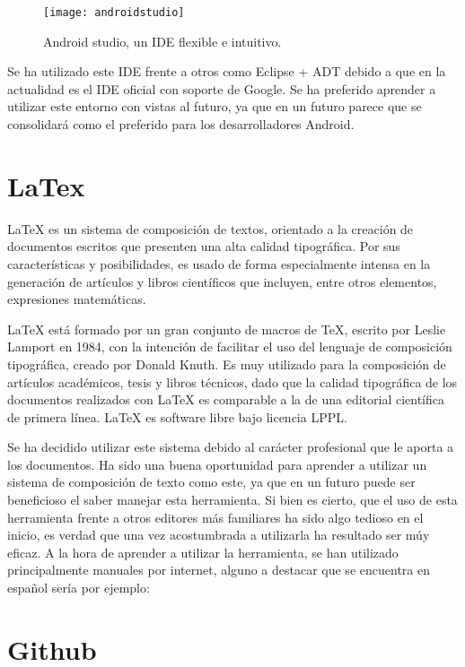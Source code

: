 \begin{figure}[h]
	\centering
	\texttt{[image: androidstudio]}
	\caption{Android studio, un IDE flexible e intuitivo.}
	\label{fig:androidstudio}
\end{figure}

Se ha utilizado este IDE frente a otros como Eclipse + ADT \cite{URL::eclipseADT} debido a que en la actualidad es el IDE oficial con soporte de Google. Se ha preferido aprender a utilizar este entorno con vistas al futuro, ya que en un futuro parece que se consolidará como el preferido para los desarrolladores Android.

\section{LaTex}

LaTeX \cite{URL::LaTeX} es un sistema de composición de textos, orientado a la creación de documentos escritos que presenten una alta calidad tipográfica. Por sus características y posibilidades, es usado de forma especialmente intensa en la generación de artículos y libros científicos que incluyen, entre otros elementos, expresiones matemáticas.


LaTeX está formado por un gran conjunto de macros de TeX, escrito por Leslie Lamport en 1984, con la intención de facilitar el uso del lenguaje de composición tipográfica, creado por Donald Knuth. Es muy utilizado para la composición de artículos académicos, tesis y libros técnicos, dado que la calidad tipográfica de los documentos realizados con LaTeX es comparable a la de una editorial científica de primera línea. LaTeX es software libre bajo licencia LPPL.


Se ha decidido utilizar este sistema debido al carácter profesional que le aporta a los documentos. Ha sido una buena oportunidad para aprender a utilizar un sistema de composición de texto como este, ya que en un futuro puede ser beneficioso el saber manejar esta herramienta. Si bien es cierto, que el uso de esta herramienta frente a otros editores más familiares ha sido algo tedioso en el inicio, es verdad que una vez acostumbrada a utilizarla ha resultado ser múy eficaz. A la hora de aprender a utilizar la herramienta, se han utilizado principalmente manuales por internet, alguno a destacar que se encuentra en español sería por ejemplo: \cite{URL::manualLatex}

\section{Github}

